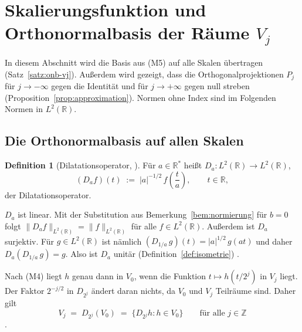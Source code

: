 \documentclass[a4paper,11pt,bibliography=totoc,listof=totoc,headinclude=true,cleardoublepage=empty,oneside]{scrbook}
\theoremstyle{plain}
\theoremstyle{definition}
\newtheorem{Definition}[Satz]{Definition}
\newcommand{\R}{\mathbb{R}}
\newcommand{\Z}{\mathbb{Z}}
\newcommand{\LZwei}{L^2(\R)}
\newcommand{\norm}[1]{\lVert #1 \rVert}
\begin{document}
\section{Skalierungsfunktion und Orthonormalbasis der Räume \texorpdfstring{$V_j$}{Vj}}
\label{sec:skalierungsfunktion}

In diesem Abschnitt wird die Basis aus (M5) auf alle Skalen übertragen
(Satz~\ref{satz:onb-vj}). Au\ss{}erdem wird gezeigt, dass die
Orthogonalprojektionen $P_j$ für $j \to -\infty$ gegen die Identität und für
$j \to +\infty$ gegen null streben (Proposition~\ref{prop:approximation}).
Normen ohne Index sind im Folgenden Normen in $\LZwei$.

\subsection{Die Orthonormalbasis auf allen Skalen}
\label{subsec:onb-alle-skalen}

\begin{Definition}[Dilatationsoperator, {\cite[Kap.~1.2]{lmr}}] %
\label{def:dilatation}
Für $a \in \R^*$ hei\ss{}t $D_a \colon \LZwei \to \LZwei$,
\[
  (D_a f)(t) \;:=\; \lvert a\rvert^{-1/2}\, f\!\left(\frac ta\right),
  \qquad t \in \R ,
\]
der Dilatationsoperator.
\end{Definition}

$D_a$ ist linear. Mit der Substitution aus Bemerkung~\ref{bem:normierung} für
$b = 0$ folgt $\norm{D_a f}_{\LZwei} = \norm{f}_{\LZwei}$ für alle
$f \in \LZwei$. Au\ss{}erdem ist $D_a$ surjektiv. Für $g \in \LZwei$ ist nämlich
$(D_{1/a}\,g)(t) = \lvert a\rvert^{1/2}\,g(at)$ und daher
$D_a(D_{1/a}\,g) = g$. Also ist $D_a$ unitär (Definition~\ref{def:isometrie})
\cite[Kap.~1.2]{lmr}. %

Nach (M4) liegt $h$ genau dann in $V_0$, wenn die Funktion
$t \mapsto h(t/2^j)$ in $V_j$ liegt. Der Faktor $2^{-j/2}$ in $D_{2^j}$ ändert
daran nichts, da $V_0$ und $V_j$ Teilräume sind. Daher gilt
\begin{equation}
\label{eq:vj-d2j}
  V_j \;=\; D_{2^{j}}(V_0) \;=\; \{D_{2^j}h : h \in V_0\}
  \qquad\text{für alle } j \in \Z
\end{equation}
\cite[Kap.~5.1, (b)]{blatter}. %
\end{document}
